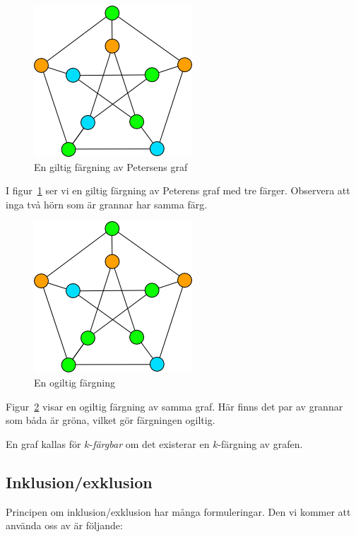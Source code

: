 \documentclass[a4paper]{report}
\begin{document}
\begin{figure}[h!]
\centering
\includegraphics{giltig_petersen}
\caption{En giltig färgning av Petersens graf }
\label{fig:petersen_coloring}
\end{figure}

I figur~\ref{fig:petersen_coloring} ser vi en giltig färgning av Peterens graf med tre färger. Observera att inga två hörn som är grannar har samma färg.

\begin{figure}[h!]
\centering
\includegraphics{ogiltig_petersen}
\caption{En ogiltig färgning}
\label{fig:invalid_coloring}
\end{figure}

Figur~\ref{fig:invalid_coloring} visar en ogiltig färgning av samma graf. Här finns det par av grannar som båda är gröna, vilket gör färgningen ogiltig.

En graf kallas för $k$-\emph{färgbar} om det existerar en $k$-färgning av grafen.

\subsection{Inklusion/exklusion}

Principen om inklusion/exklusion har många formuleringar. Den vi kommer att använda oss av är följande:
\end{document}
